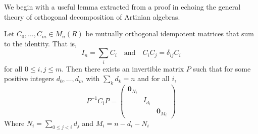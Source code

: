 \documentclass[12pt]{article}
\begin{document}
We begin with a useful lemma extracted from a proof in \cite{schur-thesis} echoing the general theory of 
orthogonal decomposition of Artinian algebras.
\begin{lem}\label{lem:orth-decomp}
	Let $C_0,\dots,C_m\in M_n(R)$ be mutually orthogonal idempotent matrices that sum to the identity. That is, 
	\[I_n=\sum_i C_i\quad\text{and}\quad C_iC_j=\delta_{ij}C_i\]
	for all $0\le i,j\le m$. Then there exists an invertible matrix $P$ such that for some positive integers $d_0,\dots,d_m$ with $\sum_k d_k=n$ and for all $i$,
	\[P^{-1}C_iP=\begin{pmatrix}
		\mathbf{0}_{N_i} & &\\
		& I_{d_i} & \\
		& & \mathbf{0}_{M_i}
	\end{pmatrix}\]
	Where $N_i=\sum_{0\le j<i}d_j$ and $M_i=n-d_i-N_i$
\end{lem}
\end{document}
